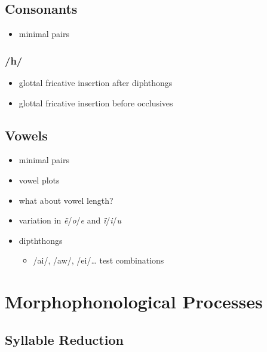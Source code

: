 \documentclass{memoir}
\begin{document}
\subsection{\texorpdfstring{Consonants
\label{sec:consonants}}{Consonants }}

\begin{itemize}
\tightlist
\item
  minimal pairs
\end{itemize}

\subsubsection{/h/}

\begin{itemize}
\tightlist
\item
  glottal fricative insertion after diphthongs
\item
  glottal fricative insertion before occlusives
\end{itemize}

\subsection{\texorpdfstring{Vowels \label{sec:vowels}}{Vowels }}

\begin{itemize}
\item
  minimal pairs
\item
  vowel plots
\item
  what about vowel length?
\item
  variation in \emph{ë}/\emph{o}/\emph{e} and \emph{ï}/\emph{i}/\emph{u}
\item
  dipththongs

  \begin{itemize}
  \tightlist
  \item
    /ai/, /aw/, /ei/\ldots{} test combinations
  \end{itemize}
\end{itemize}

\section{\texorpdfstring{Morphophonological Processes
\label{sec:morphophono}}{Morphophonological Processes }}

\subsection{\texorpdfstring{Syllable Reduction
\label{sec:sylred}}{Syllable Reduction }}
\end{document}
